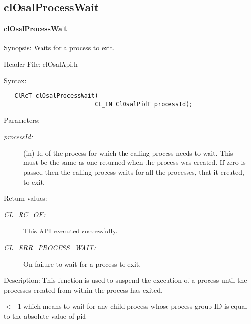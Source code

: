 \newpage
\subsection{clOsalProcessWait} 
\hypertarget{pageosal143}{}\paragraph{cl\-Osal\-Process\-Wait}\label{pageosal143}
\begin{Desc}
\item[Synopsis:]Waits for a process to exit.\end{Desc}
\begin{Desc}
\item[Header File:]clOsalApi.h\end{Desc}
\begin{Desc}
\item[Syntax:]

\footnotesize\begin{verbatim}   ClRcT clOsalProcessWait(
                          CL_IN ClOsalPidT processId);
\end{verbatim}
\normalsize
\end{Desc}
\begin{Desc}
\item[Parameters:]
\begin{description}
\item[{\em process\-Id:}](in) Id of the process for which the calling process needs to wait. This must be the same as one returned when the process was created. If zero is passed then the calling process waits for all the processes, that it created, to exit.\end{description}
\end{Desc}
\begin{Desc}
\item[Return values:]
\begin{description}
\item[{\em CL\_\-RC\_\-OK:}]This API executed successfully. \item[{\em CL\_\-ERR\_\-PROCESS\_\-WAIT:}]On failure to wait for a process to exit.\end{description}
\end{Desc}
\begin{Desc}
\item[Description:]This function is used to suspend the execution of a process until the processes created from within the process has exited.\end{Desc}
$<$ -1 which means to wait for any child process whose process group ID is equal to the absolute value of pid

